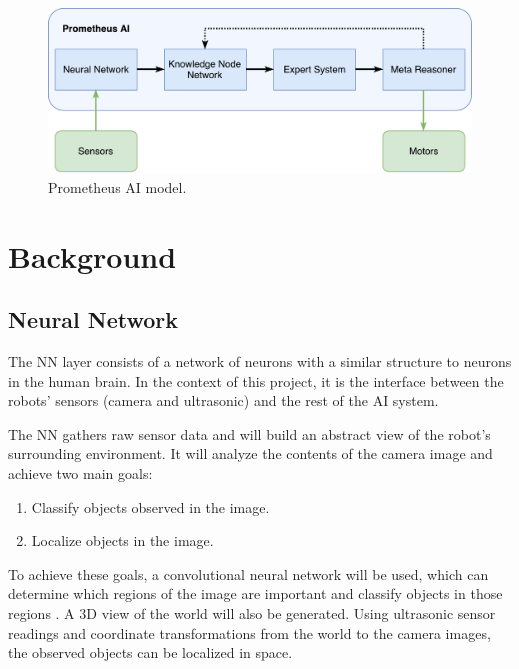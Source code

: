 \documentclass[titlepage,11pt]{article}
\begin{document}
\begin{figure}[!htb]
	\includegraphics[width=\columnwidth]{figures/ai_model.pdf}
	\caption{Prometheus AI model.}
	\label{model}
\end{figure}

\section{Background}
\label{sec:background}

\subsection{Neural Network}

The NN layer consists of a network of neurons with a similar structure to neurons in the human brain. In the context of this project, it is the interface between the robots' sensors (camera and ultrasonic) and the rest of the AI system.

The NN gathers raw sensor data and will build an abstract view of the robot's surrounding environment. It will analyze the contents of the camera image and achieve two main goals:

\begin{enumerate}
	\item Classify objects observed in the image.
	\item Localize objects in the image.
\end{enumerate}

To achieve these goals, a convolutional neural network will be used, which can determine which regions of the image are important and classify objects in those regions \cite{conv}. A 3D view of the world will also be generated. Using ultrasonic sensor readings and coordinate transformations from the world to the camera images, the observed objects can be localized in space.
\end{document}
